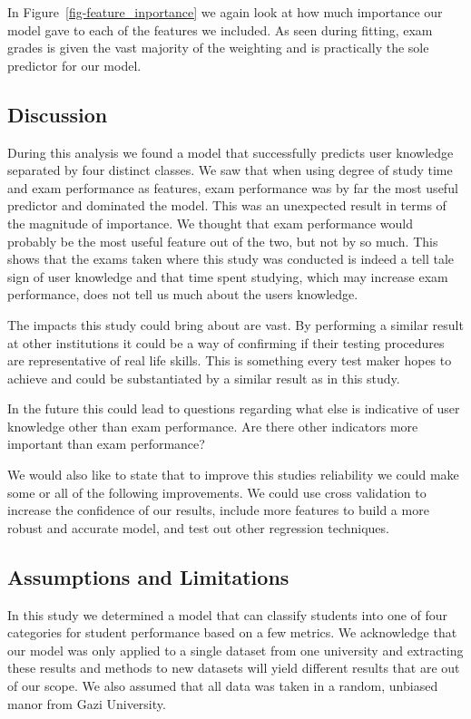 \documentclass[
  letterpaper,
  DIV=11,
  numbers=noendperiod]{scrartcl}
\begin{document}
In Figure~\ref{fig-feature_inportance} we again look at how much
importance our model gave to each of the features we included. As seen
during fitting, exam grades is given the vast majority of the weighting
and is practically the sole predictor for our model.

\subsection{\texorpdfstring{\textbf{Discussion}}{Discussion}}\label{discussion}

During this analysis we found a model that successfully predicts user
knowledge separated by four distinct classes. We saw that when using
degree of study time and exam performance as features, exam performance
was by far the most useful predictor and dominated the model. This was
an unexpected result in terms of the magnitude of importance. We thought
that exam performance would probably be the most useful feature out of
the two, but not by so much. This shows that the exams taken where this
study was conducted is indeed a tell tale sign of user knowledge and
that time spent studying, which may increase exam performance, does not
tell us much about the users knowledge.

The impacts this study could bring about are vast. By performing a
similar result at other institutions it could be a way of confirming if
their testing procedures are representative of real life skills. This is
something every test maker hopes to achieve and could be substantiated
by a similar result as in this study.

In the future this could lead to questions regarding what else is
indicative of user knowledge other than exam performance. Are there
other indicators more important than exam performance?

We would also like to state that to improve this studies reliability we
could make some or all of the following improvements. We could use cross
validation to increase the confidence of our results, include more
features to build a more robust and accurate model, and test out other
regression techniques.

\subsection{\texorpdfstring{\textbf{Assumptions and
Limitations}}{Assumptions and Limitations}}\label{assumptions-and-limitations}

In this study we determined a model that can classify students into one
of four categories for student performance based on a few metrics. We
acknowledge that our model was only applied to a single dataset from one
university and extracting these results and methods to new datasets will
yield different results that are out of our scope. We also assumed that
all data was taken in a random, unbiased manor from Gazi University.
\end{document}
